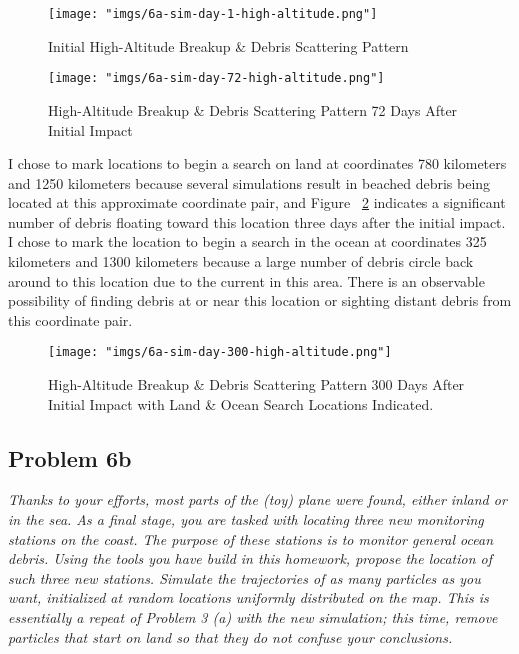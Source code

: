 \documentclass[11pt]{article}
\newcommand{\question}[1]{\textit{#1}}
\begin{document}
\begin{figure}[htbp]
    \centering
    \texttt{[image: "imgs/6a-sim-day-1-high-altitude.png"]} %
    \caption{Initial High-Altitude Breakup \& Debris Scattering Pattern}
    \label{fig:6a-sim-day-1-high-altitude}
\end{figure}
\FloatBarrier

\begin{figure}[htbp]
    \centering
    \texttt{[image: "imgs/6a-sim-day-72-high-altitude.png"]} %
    \caption{High-Altitude Breakup \& Debris Scattering Pattern 72 Days After Initial Impact}
    \label{fig:6a-sim-day-72-high-altitude}
\end{figure}
\FloatBarrier

I chose to mark locations to begin a search on land at coordinates 780 kilometers and 1250 kilometers because several simulations result in beached debris being located at this approximate coordinate pair, and Figure ~\ref{fig:6a-sim-day-72-high-altitude} indicates a significant number of debris floating toward this location three days after the initial impact. I chose to mark the location to begin a search in the ocean at coordinates 325 kilometers and 1300 kilometers because a large number of debris circle back around to this location due to the current in this area. There is an observable possibility of finding debris at or near this location or sighting distant debris from this coordinate pair. 

\begin{figure}[htbp]
    \centering
    \texttt{[image: "imgs/6a-sim-day-300-high-altitude.png"]} %
    \caption{High-Altitude Breakup \& Debris Scattering Pattern 300 Days After Initial Impact with Land \& Ocean Search Locations Indicated.}
    \label{fig:6a-sim-day-300-high-altitude}
\end{figure}
\FloatBarrier

\subsection{Problem 6b}

\question{Thanks to your efforts, most parts of the (toy) plane were found, either inland or in the sea. As a final stage, you are tasked with locating three new monitoring stations on the coast. The purpose of these stations is to monitor general ocean debris. Using the tools you have build in this homework, propose the location of such three new stations. Simulate the trajectories of as many particles as you want, initialized at random locations uniformly distributed on the map. This is essentially a repeat of Problem 3 (a) with the new simulation; this time, remove particles that start on land so that they do not confuse your conclusions.}
\end{document}
